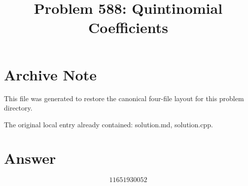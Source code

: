 \documentclass[11pt]{article}
\title{Problem 588: Quintinomial Coefficients}
\author{}
\date{}
\begin{document}
\maketitle

\section{Archive Note}
This file was generated to restore the canonical four-file layout for this problem directory.

The original local entry already contained: solution.md, solution.cpp.

\section{Answer}

\[
\boxed{11651930052}
\]
\end{document}
